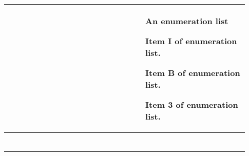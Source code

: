 \begin{footnotesize}
\begin{longtable}{ | P{0.53\linewidth} | p{0.4\linewidth} | }
                                                                                                           &
        An enumeration list
        \begin{tsLTItemize}
            \item Item I of enumeration list.
            \item Item B of enumeration list.
            \item Item 3 of enumeration list.
        \end{tsLTItemize}
        \\
        \hline
                                                         &
                                                                                            \\
        \hline
                                                       &
                                                                                          \\
        \hline
                                                        &
                                                                                           \\
        \hline
                                                    &
                                                                                       \\
        \hline
                                                       &
                                                                                          \\
        \hline
                                                       &
                                                                                          \\

\end{longtable}
\end{footnotesize}
